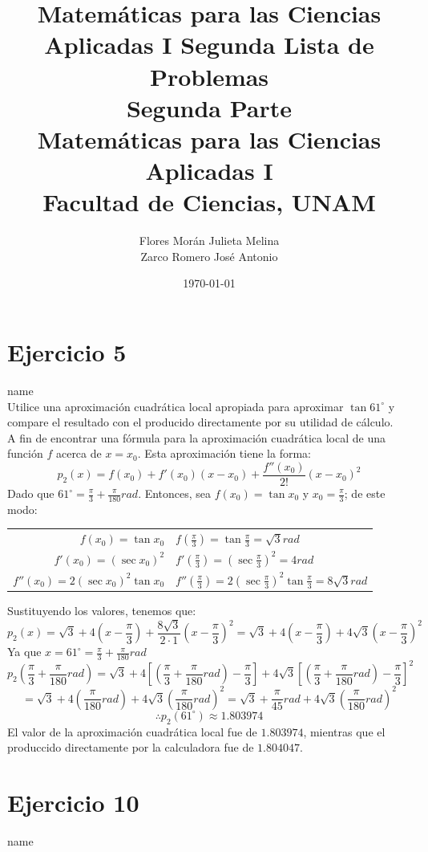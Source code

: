 \documentclass[12pt]{article}
\title{Matemáticas para las Ciencias Aplicadas I}
\title{
	Segunda Lista de Problemas \\
	\textbf{Segunda Parte} \\
	\vspace{1ex}
	\large Matemáticas para las Ciencias Aplicadas I \\
	Facultad de Ciencias, UNAM}
\date{\today}
\author{Flores Morán Julieta Melina \\ Zarco Romero José Antonio}
\begin{document}
\maketitle


\section{Ejercicio 5} name \\

Utilice una aproximación cuadrática local apropiada para aproximar $\tan 61^{\circ}$ y compare el resultado con el producido directamente por su utilidad de cálculo. \\

A fin de encontrar una fórmula para la aproximación cuadrática local de una función $f$ acerca de $x=x_0$. Esta aproximación tiene la forma:
\[p_2(x)=f(x_0)+f'(x_0)(x-x_0)+\frac{f''(x_0)}{2!}(x-x_0)^2\]
Dado que $61^{\circ} = \frac{\pi}{3} + \frac{\pi}{180} rad$. Entonces, sea $f(x_0)=\tan x_0$ y $x_0=\frac{\pi}{3}$; de este modo:
\begin{center}
\begin{tabular}{r l}
$f(x_0)=\tan x_0$ & $f(\frac{\pi}{3})=\tan \frac{\pi}{3}=\sqrt 3 rad$ \\
$f'(x_0)=(\sec x_0)^2$ & $f'(\frac{\pi}{3})=(\sec \frac{\pi}{3})^2=4 rad$ \\
$f''(x_0)=2 (\sec x_0)^2 \tan x_0$ & $f''(\frac{\pi}{3})=2 (\sec \frac{\pi}{3})^2 \tan \frac{\pi}{3}=8\sqrt 3 rad$ \\
\end{tabular}
\end{center}
Sustituyendo los valores, tenemos que:
\[
p_2(x)=\sqrt 3 + 4(x-\frac{\pi}{3}) + \frac{8 \sqrt 3}{2 \cdot 1}(x-\frac{\pi}{3})^2
=\sqrt 3 + 4(x-\frac{\pi}{3}) + 4 \sqrt 3(x-\frac{\pi}{3})^2
\]
Ya que $x=61^{\circ}=\frac{\pi}{3} + \frac{\pi}{180}rad$
\[
p_2(\frac{\pi}{3} + \frac{\pi}{180}rad)
=\sqrt 3 + 4[(\frac{\pi}{3} + \frac{\pi}{180}rad)-\frac{\pi}{3}] + 4 \sqrt 3[(\frac{\pi}{3} + \frac{\pi}{180}rad)-\frac{\pi}{3}]^2
\]
\[
=\sqrt 3 + 4(\frac{\pi}{180}rad) + 4 \sqrt 3(\frac{\pi}{180}rad)^2
= \sqrt 3 + \frac{\pi}{45}rad + 4 \sqrt 3(\frac{\pi}{180}rad)^2
\]
\[\therefore p_2(61^{\circ}) \approx 1.803974\]
El valor de la aproximación cuadrática local fue de $1.803974$, mientras que el produccido directamente por la calculadora fue de $1.804047$.

\section{Ejercicio 10} name \\
\end{document}
